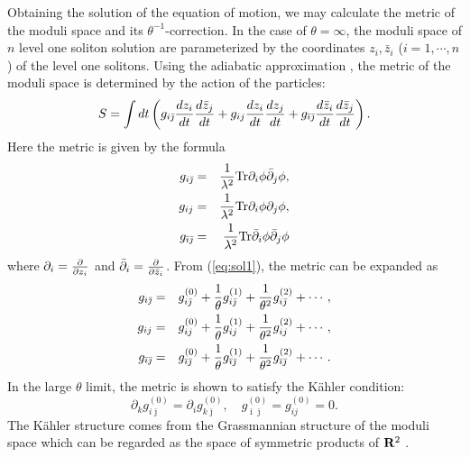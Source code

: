 \documentclass[a4paper,12pt]{article}
\begin{document}
Obtaining the solution of the equation of motion, we may calculate the
metric of the moduli space and its $\theta^{-1}$-correction.
In the case of $\theta=\infty$, the moduli space of $n$ level one soliton
solution are parameterized by the coordinates $z_{i},\bar{z}_{i}$
($i=1,\cdots,n $)
of the level one solitons.
Using the adiabatic approximation \cite{Ma}, the metric of the moduli space
is
determined  by the action of the particles:
\begin{equation}
 S=\int dt \left(g_{i\bar{\jmath}}
 {d z_{i}\over dt} {d \bar{z}_{j}\over dt}
+g_{ij} {d z_{i}\over dt} {d z_{j}\over dt}
+g_{\bar{\imath}\bar{\jmath}}
 {d \bar{z}_{i}\over dt} {d \bar{z}_{j}\over dt} \right).
\end{equation}
Here the metric is given by the formula
\begin{eqnarray}
 g_{i\bar{\jmath}}&=& {1\over\lambda^2}
{\rm Tr}\partial_{i}\phi \bar{\partial}_{j}\phi,
\nonumber\\
g_{ij}&=& {1\over\lambda^2}
{\rm Tr}\partial_{i}\phi \partial_{j}\phi,
\nonumber\\
g_{\bar{\imath}\bar{\jmath}}&=&
{1\over\lambda^2}
{\rm Tr}\bar{\partial}_{i}\phi \bar{\partial}_{j}\phi
\end{eqnarray}
where $\partial_{i}={\partial\over \partial z_{i}}$ and
$\bar{\partial}_{i}={\partial\over \partial \bar{z}_{i}}$.
{}From (\ref{eq:sol1}), the metric can be expanded as
\begin{eqnarray}
g_{i\bar{\jmath}}&=&
g^{(0)}_{i\bar{\jmath}}+{1\over \theta}g^{(1)}_{i\bar{\jmath}}
+{1\over \theta^2}g^{(2)}_{i\bar{\jmath}}+\cdots ,
\nonumber\\
g_{ij}&=& g^{(0)}_{ij}+{1\over \theta}g^{(1)}_{ij}
+{1\over \theta^2}g^{(2)}_{ij}+\cdots ,
\nonumber\\
g_{\bar{\imath}\bar{\jmath}}&=&
g^{(0)}_{\bar{\imath}\bar{\jmath}}
+{1\over \theta}g^{(1)}_{\bar{\imath}\bar{\jmath}}
+{1\over \theta^2}g^{(2)}_{\bar{\imath}\bar{\jmath}}+\cdots .
\end{eqnarray}
In the large  $\theta$ limit, the metric is shown to satisfy
the K\"ahler condition\cite{GHS}:
\begin{equation}
\partial_{k} g^{(0)}_{i\bar{\jmath}}
=\partial_{i}g^{(0)}_{k\bar{\jmath}},
\quad  g^{(0)}_{\bar{\imath}\bar{\jmath}}=g^{(0)}_{ij}=0.
\end{equation}
The K\"ahler structure comes from the Grassmannian structure of the
moduli space \cite{Mat} which can be regarded as the space of symmetric
products of ${\bf R}^{2}$ \cite{GHS}.
\end{document}
